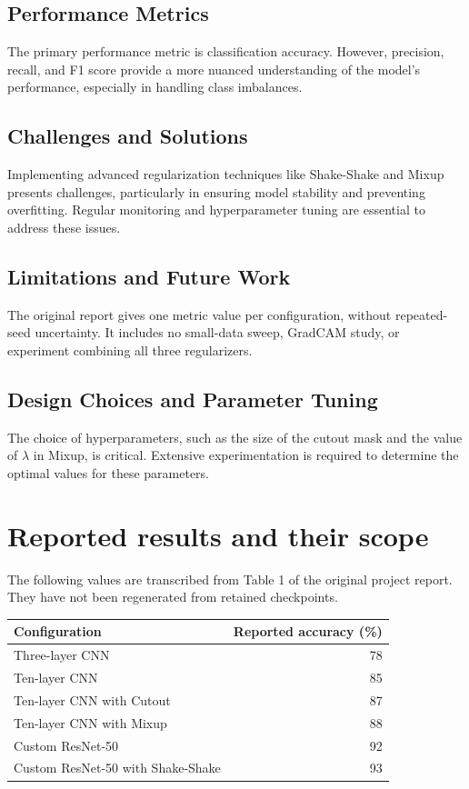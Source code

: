 \documentclass[12pt]{article}
\begin{document}
\subsection{Performance Metrics}
The primary performance metric is classification accuracy. However, precision, recall, and F1 score provide a more nuanced understanding of the model's performance, especially in handling class imbalances.

\subsection{Challenges and Solutions}
Implementing advanced regularization techniques like Shake-Shake and Mixup presents challenges, particularly in ensuring model stability and preventing overfitting. Regular monitoring and hyperparameter tuning are essential to address these issues.

\subsection{Limitations and Future Work}
The original report gives one metric value per configuration, without repeated-seed uncertainty. It includes no small-data sweep, GradCAM study, or experiment combining all three regularizers.

\subsection{Design Choices and Parameter Tuning}
The choice of hyperparameters, such as the size of the cutout mask and the value of \(\lambda\) in Mixup, is critical. Extensive experimentation is required to determine the optimal values for these parameters.


\section{Reported results and their scope}

The following values are transcribed from Table 1 of the original project
report. They have not been regenerated from retained checkpoints.

\begin{center}
\begin{tabular}{lr}
\toprule
Configuration & Reported accuracy (\%)\\
\midrule
Three-layer CNN & 78\\
Ten-layer CNN & 85\\
Ten-layer CNN with Cutout & 87\\
Ten-layer CNN with Mixup & 88\\
Custom ResNet-50 & 92\\
Custom ResNet-50 with Shake-Shake & 93\\
\bottomrule
\end{tabular}
\end{center}
\end{document}
